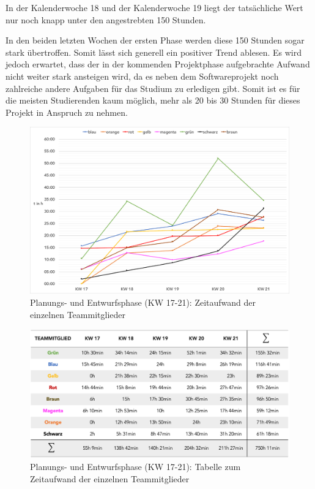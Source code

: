 \documentclass[../review_3.tex]{subfiles}
\begin{document}
In der Kalenderwoche 18 und der Kalenderwoche 19 liegt der tatsächliche Wert nur noch knapp unter den angestrebten 150 Stunden.

In den beiden letzten Wochen der ersten Phase werden diese 150 Stunden sogar stark übertroffen.
Somit lässt sich generell ein positiver Trend ablesen. Es wird jedoch erwartet, dass der in der kommenden Projektphase aufgebrachte Aufwand nicht weiter stark ansteigen wird, da es neben dem Softwareprojekt noch zahlreiche andere Aufgaben für das Studium zu erledigen gibt. Somit ist es für die meisten Studierenden kaum möglich, mehr als 20 bis 30 Stunden für dieses Projekt in Anspruch zu nehmen.

\begin{figure} [h]
    \centering
    \includegraphics[width = \linewidth]{img/Kimai3.pdf}
    \caption{Planungs- und Entwurfsphase (KW 17-21): Zeitaufwand der einzelnen Teammitglieder}
    \label{teammitglieder}
\end{figure}

\begin{figure} [h]
    \centering
    \includegraphics[width = \linewidth]{img/Kimai4.png}
    \caption{Planungs- und Entwurfsphase (KW 17-21): Tabelle zum Zeitaufwand der einzelnen Teammitglieder}
    \label{teammitglieder2}
\end{figure}
\end{document}
